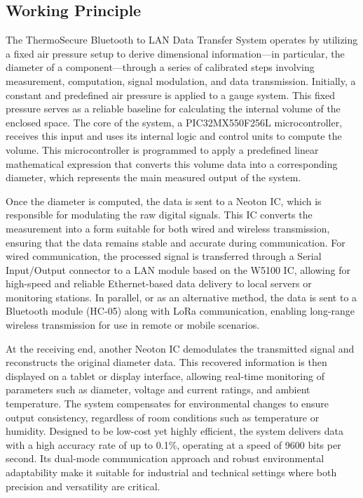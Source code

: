 \documentclass[12pt]{report}
\begin{document}
\subsection{Working Principle}
The ThermoSecure Bluetooth to LAN Data Transfer System operates by utilizing a fixed air pressure setup to derive dimensional information—in particular, the diameter of a component—through a series of calibrated steps involving measurement, computation, signal modulation, and data transmission. Initially, a constant and predefined air pressure is applied to a gauge system. This fixed pressure serves as a reliable baseline for calculating the internal volume of the enclosed space. The core of the system, a PIC32MX550F256L microcontroller, receives this input and uses its internal logic and control units to compute the volume. This microcontroller is programmed to apply a predefined linear mathematical expression that converts this volume data into a corresponding diameter, which represents the main measured output of the system.

Once the diameter is computed, the data is sent to a Neoton IC, which is responsible for modulating the raw digital signals. This IC converts the measurement into a form suitable for both wired and wireless transmission, ensuring that the data remains stable and accurate during communication. For wired communication, the processed signal is transferred through a Serial Input/Output connector to a LAN module based on the W5100 IC, allowing for high-speed and reliable Ethernet-based data delivery to local servers or monitoring stations. In parallel, or as an alternative method, the data is sent to a Bluetooth module (HC-05) along with LoRa communication, enabling long-range wireless transmission for use in remote or mobile scenarios.

At the receiving end, another Neoton IC demodulates the transmitted signal and reconstructs the original diameter data. This recovered information is then displayed on a tablet or display interface, allowing real-time monitoring of parameters such as diameter, voltage and current ratings, and ambient temperature. The system compensates for environmental changes to ensure output consistency, regardless of room conditions such as temperature or humidity. Designed to be low-cost yet highly efficient, the system delivers data with a high accuracy rate of up to 0.1\%, operating at a speed of 9600 bits per second. Its dual-mode communication approach and robust environmental adaptability make it suitable for industrial and technical settings where both precision and versatility are critical.
\end{document}
